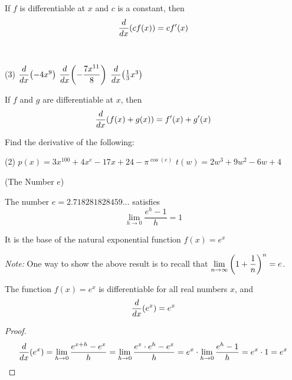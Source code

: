 \documentclass[../mathNotesPreamble]{subfiles}
\begin{document}
  \begin{thmBox*}
    If $f$ is differentiable at $x$ and $c$ is a constant, then
      $$\dfrac{d}{dx}{\left(cf(x)\right)}=cf'(x)$$
  \end{thmBox*}

\begin{ex*}\ 
  \begin{tasks}(3)
    \task[] $\dfrac{d}{dx}{\left(-4x^9\right)}$
    \task[] $\dfrac{d}{dx}{\left(-\dfrac{7x^{11}}{8}\right)}$
    \task[] $\dfrac{d}{dx}{\left(\frac{1}{3}x^3\right)}$
  \end{tasks}
\end{ex*}
\vspace*{\stretch{1}}

\begin{thmBox*}
  If $f$ and $g$ are differentiable at $x$, then 
    $$\dfrac{d}{dx}{\left(f(x)+g(x)\right)}=f'(x)+g'(x)$$
\end{thmBox*}

\begin{ex*}
  Find the derivative of the following:
  \begin{tasks}(2)
    \task[] $p(x)=3x^{100}+4x^e-17x+24-\pi^{\cos(e)}$
    \task[] $t(w)=2w^3+9w^2-6w+4$
  \end{tasks}
\end{ex*}
\pagebreak

\begin{defn*}(The Number $e$)

  The number $e=2.718281828459\dots$ satisfies
    $$\lim_{h\to 0} \dfrac{e^h-1}{h}=1$$

  It is the base of the natural exponential function $f(x)=e^x$
\end{defn*}
\textit{Note:} One way to show the above result is to recall that $\displaystyle\lim_{n\to \infty} {\left(1+\dfrac{1}{n}\right)}^n=e$.
\vspace*{30pt}

\begin{thmBox*}
  The function $f(x)=e^x$ is differentiable for all real numbers $x$, and 
    $$\dfrac{d}{dx}{\left(e^x\right)}=e^x$$
\end{thmBox*}
\vspace*{20pt}

\begin{proof}
  $$\dfrac{d}{dx}{\left(e^x\right)}
      =\lim_{h\to 0}\dfrac{e^{x+h}-e^x}{h}
      =\lim_{h\to 0} \dfrac{e^x\cdot e^h-e^x}{h}
      =e^x\cdot\lim_{h\to 0} \dfrac{e^h-1}{h}
      =e^x\cdot 1=e^x$$
\end{proof}
\vspace*{20pt}
\end{document}
